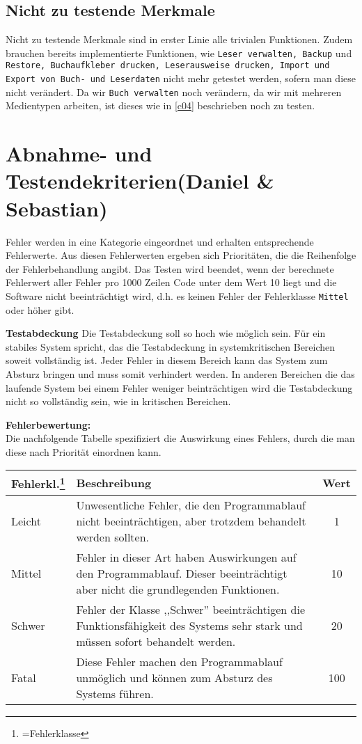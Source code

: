 \documentclass[fontsize=12pt,paper=a4,twoside]{scrartcl}
\begin{document}
\subsection{Nicht zu testende Merkmale}\label{c05}
Nicht zu testende Merkmale sind in erster Linie alle trivialen Funktionen. Zudem brauchen bereits implementierte Funktionen, wie \texttt{Leser verwalten, Backup} und \texttt{Restore, Buchaufkleber drucken, Leserausweise drucken, Import und Export von Buch- und Leserdaten} nicht mehr getestet werden, sofern man diese nicht verändert. Da wir \texttt{Buch verwalten} noch verändern, da wir mit mehreren Medientypen arbeiten, ist dieses wie in \ref{c04} beschrieben noch zu testen.

\section{Abnahme- und Testendekriterien(Daniel \& Sebastian)}\label{c07}
Fehler werden in eine Kategorie eingeordnet und erhalten entsprechende Fehlerwerte. Aus diesen Fehlerwerten ergeben sich Prioritäten, die die Reihenfolge der Fehlerbehandlung angibt. Das Testen wird beendet, wenn der berechnete Fehlerwert aller Fehler pro 1000 Zeilen Code unter dem Wert 10 liegt und die Software nicht beeinträchtigt wird, d.h. es keinen Fehler der Fehlerklasse \texttt{Mittel} oder höher gibt.

\textbf{Testabdeckung}
Die Testabdeckung soll so hoch wie möglich sein. Für ein stabiles System spricht, das die Testabdeckung in systemkritischen Bereichen soweit vollständig ist. Jeder Fehler in diesem Bereich kann das System zum Absturz bringen und muss somit verhindert werden. In anderen Bereichen die das laufende System bei einem Fehler weniger beinträchtigen wird die Testabdeckung nicht so vollständig sein, wie in kritischen Bereichen.

\textbf{Fehlerbewertung:}\\
Die nachfolgende Tabelle spezifiziert die Auswirkung eines Fehlers, durch die man diese nach Priorität einordnen kann.\\

\begin{tabularx}{\textwidth}{|p{2cm}|p{11.53cm}|c|}
\hline
	\textbf{Fehlerkl.\footnote{=Fehlerklasse}} & \textbf{Beschreibung} & \textbf{Wert}\\
\hline
	Leicht & Unwesentliche Fehler, die den Programmablauf nicht beeinträchtigen, aber trotzdem behandelt werden sollten. & 1\\
\hline
	Mittel & Fehler in dieser Art haben Auswirkungen auf den Programmablauf. Dieser beeinträchtigt aber nicht die grundlegenden Funktionen. & 10\\
\hline
	Schwer & Fehler der Klasse ,,Schwer'' beeinträchtigen die Funktionsfähigkeit des Systems sehr stark und müssen sofort behandelt werden. & 20\\
\hline
	Fatal & Diese Fehler machen den Programmablauf unmöglich und können zum Absturz des Systems führen.  & 100\\
\hline
\end{tabularx}
\end{document}
